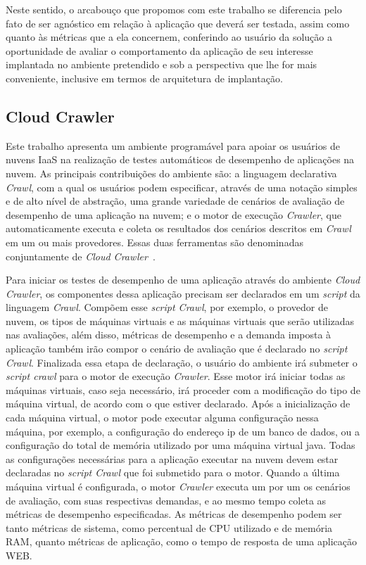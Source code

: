 Neste sentido, o arcabouço que propomos com este trabalho se diferencia pelo fato
de ser agnóstico em relação à aplicação que deverá ser testada, assim como quanto 
às métricas que a ela concernem, conferindo ao usuário da solução a oportunidade 
de avaliar o comportamento da aplicação de seu interesse implantada no ambiente
pretendido e sob a perspectiva que lhe for mais conveniente, inclusive em termos
de arquitetura de implantação. 

\subsection{Cloud Crawler}
Este trabalho apresenta um ambiente programável para apoiar os usuários de nuvens IaaS na realização de testes automáticos de desempenho de aplicações na nuvem. As principais contribuições do ambiente são: a linguagem declarativa {\em Crawl}, com a qual os usuários podem especificar, através de uma notação simples e de alto nível de abstração, uma grande variedade de cenários de avaliação de desempenho de uma aplicação na nuvem; e o motor de execução {\em Crawler}, que automaticamente executa e coleta os resultados dos cenários descritos em {\em Crawl} em um ou mais provedores. Essas duas ferramentas são denominadas conjuntamente de {\em Cloud Crawler}~\cite{cunhacloud}.

Para iniciar os testes de desempenho de uma aplicação através do ambiente {\em Cloud Crawler}, os componentes dessa aplicação precisam ser declarados em um \textit{script} da linguagem {\em Crawl}. Compõem esse \textit{script Crawl}, por exemplo, o provedor de nuvem, os tipos de máquinas virtuais e as máquinas virtuais que serão utilizadas nas avaliações, além disso, métricas de desempenho e a demanda imposta à aplicação também irão compor o cenário de avaliação que é declarado no \textit{script Crawl}. Finalizada essa etapa de declaração, o usuário do ambiente irá submeter o \textit{script crawl} para o motor de execução {\em Crawler}. Esse motor irá iniciar todas as máquinas virtuais, caso seja necessário, irá proceder com a modificação do tipo de máquina virtual, de acordo com o que estiver declarado. Após a inicialização de cada máquina virtual, o motor pode executar alguma configuração nessa máquina, por exemplo, a configuração do endereço ip de um banco de dados, ou a configuração do total de memória utilizado por uma máquina virtual java. Todas as configurações necessárias para a aplicação executar na nuvem devem estar declaradas no {\em script Crawl} que foi submetido para o motor. Quando a última máquina virtual é configurada, o motor {\em Crawler} executa um por um os cenários de avaliação, com suas respectivas demandas, e ao mesmo tempo coleta as métricas de desempenho especificadas. As métricas de desempenho podem ser tanto métricas de sistema, como percentual de CPU utilizado e de memória RAM, quanto métricas de aplicação, como o tempo de resposta de uma aplicação WEB.

